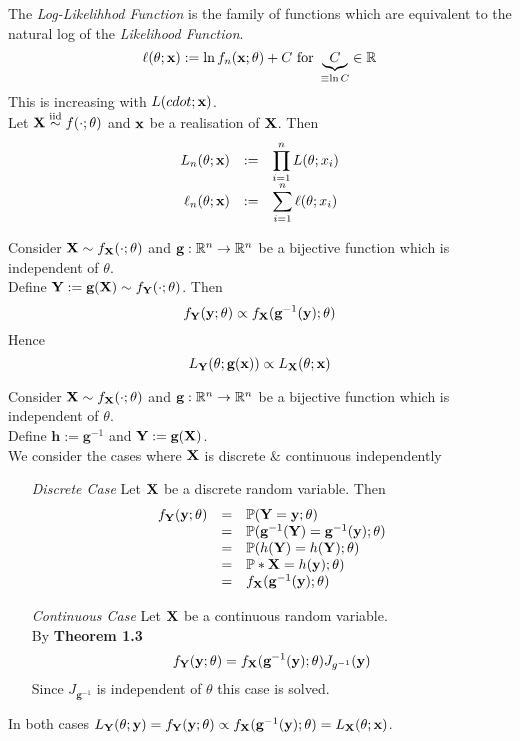 \documentclass[11pt,a4paper]{article}
\begin{document}
The \textit{Log-Likelihhod Function} is the family of functions which are equivalent to the natural log of the \textit{Likelihood Function}.
$$\ell(\theta;\textbf{x}):=\ln f_n(\textbf{x};\theta)+C\text{ for }\underbrace{C}_{\equiv\ln C}\in\mathbb{R}$$
\nb This is increasing with $L(cdot;\textbf{x})$.\\

Let $\textbf{X}\overset{\text{iid}}{\sim} f(\cdot;\theta)$ and $\textbf{x}$ be a realisation of $\textbf{X}$. Then
\[\begin{array}{rcl}
L_n(\theta;\textbf{x})&:=&{\displaystyle\prod_{i=1}^nL(\theta;x_i)}\\
\ell_n(\theta;\textbf{x})&:=&{\displaystyle\sum_{i=1}^n\ell(\theta;x_i)}
\end{array}\]

Consider $\textbf{X}\sim f_{\textbf{X}}(\cdot;\theta)$ and $\textbf{g}:\mathbb{R}^n\to\mathbb{R}^n$ be a bijective function which is independent of $\theta$.\\
Define $\textbf{Y}:=\textbf{g}(\textbf{X})\sim f_\textbf{Y}(\cdot;\theta)$. Then
$$f_\textbf{Y}(\textbf{y};\theta)\propto f_{\textbf{X}}(\textbf{g}^{-1}(\textbf{y});\theta)$$
Hence
$$L_\textbf{Y}(\theta;\textbf{g}(\textbf{x}))\propto L_{\textbf{X}}(\theta;\textbf{x})$$

Consider $\textbf{X}\sim f_{\textbf{X}}(\cdot;\theta)$ and $\textbf{g}:\mathbb{R}^n\to\mathbb{R}^n$ be a bijective function which is independent of $\theta$.\\
Define $\textbf{h}:=\textbf{g}^{-1}$ and $\textbf{Y}:=\textbf{g}(\textbf{X})$.\\
We consider the cases where $\textbf{X}$ is discrete \& continuous independently
\begin{itemize}
	\item[\textit{Discrete Case}] Let $\textbf{X}$ be a discrete random variable. Then
	\[\begin{array}{rcl}
	f_\textbf{Y}(\textbf{y};\theta)&=&\mathbb{P}(\textbf{Y}=\textbf{y};\theta)\\
	&=&\mathbb{P}(\textbf{g}^{-1}(\textbf{Y})=\textbf{g}^{-1}(\textbf{y});\theta)\\
	&=&\mathbb{P}(h(\textbf{Y})=h(\textbf{Y});\theta)\\
	&=&\mathbb{P}*\textbf{X}=h(\textbf{y});\theta)\\
	&=&f_{\textbf{X}}(\textbf{g}^{-1}(\textbf{y});\theta)
	\end{array}\]
	\item[\textit{Continuous Case}] Let $\textbf{X}$ be a continuous random variable.\\
	By \textbf{Theorem 1.3}
	$$f_\textbf{Y}(\textbf{y};\theta)=f_{\textbf{X}}(\textbf{g}^{-1}(\textbf{y});\theta)J_{g^{-1}}(\textbf{y})$$
	Since $J_{\textbf{g}^{-1}}$ is independent of $\theta$ this case is solved.
\end{itemize}
In both cases $L_\textbf{Y}(\theta;\textbf{y})=f_\textbf{Y}(\textbf{y};\theta)\propto f_{\textbf{X}}(\textbf{g}^{-1}(\textbf{y});\theta)=L_{\textbf{X}}(\theta;\textbf{x})$.\proved
\end{document}
